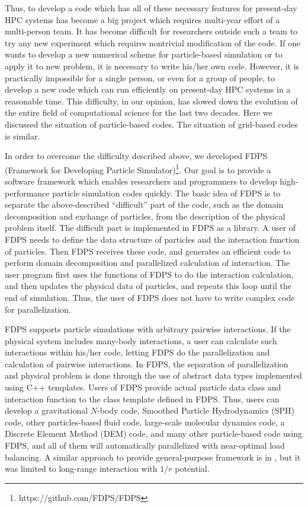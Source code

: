 Thus, to develop a code which has all of these necessary features for
present-day HPC systems has become a big project which requires
multi-year effort of a multi-person team. It has become difficult for
researchers outside such a team to try any new experiment which
requires nontrivial modification of the code. If one wants to develop
a new numerical scheme for particle-based simulation or to apply it to
new problem, it is necessary to write his/her own code. However, it is
practically impossible for a single person, or even for a group of
people, to develop a new code which can run efficiently on present-day
HPC systems in a reasonable time.  This difficulty, in our opinion, has
slowed down the evolution of the entire field of computational science
for the last two decades. Here we discussed the situation of
particle-based codes. The situation of grid-based codes is similar. 

In order to overcome the difficulty described above, we developed FDPS
(Framework for Developing Particle
Simulator)\footnote{https://github.com/FDPS/FDPS}. Our goal is to
provide a software framework which enables researchers and programmers
to develop high-performance particle simulation codes quickly. The
basic idea of FDPS is to separate the above-described ``difficult''
part of the code, such as the domain decomposition and exchange of
particles, from the description of the physical problem itself. The
difficult part is implemented in FDPS as a library. A user of FDPS
needs to define the data structure of particles and the interaction
function of particles. Then FDPS receives these code, and generates an
efficient code to perform domain decomposition and parallelized
calculation of interaction. The user program first uses the functions
of FDPS to do the interaction calculation, and then updates the
physical data of particles, and repeats this loop until the end of
simulation.  Thus, the user of FDPS does not have to write complex
code for parallelization.

FDPS supports particle simulations with arbitrary pairwise
interactions. If the physical system includes many-body interactions,
a user can calculate such interactions within his/her code, letting
FDPS do the parallelization and calculation of pairwise interactions.
In FDPS, the separation of parallelization and physical problem is
done through the use of abstract data types implemented using C++
templates. Users of FDPS provide actual particle data class and
interaction function to the class template defined in FDPS. Thus,
users can develop a gravitational $N$-body code, Smoothed Particle
Hydrodynamics (SPH) code, other particles-based fluid code,
large-scale molecular dynamics code, a Discrete Element Method (DEM)
code, and many other particle-based code using FDPS, and all of them
will automatically parallelized with near-optimal load balancing. A
similar approach to provide general-purpose framework is
in \cite{1995CoPhC..87..266W}, but it was limited to long-range
interaction with $1/r$ potential.

